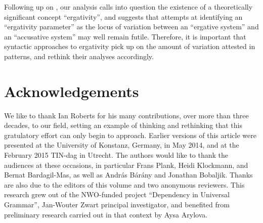 \documentclass[output=paper]{langsci/langscibook}
\begin{document}
Following up on \citet{DeLancey2004}, our analysis calls into question the
existence of a theoretically significant concept \enquote{ergativity}, and
suggests that attempts at identifying an \enquote{ergativity parameter} as the
locus of variation between an \enquote{ergative system} and an
\enquote{accusative system} may well remain futile. Therefore, it is important
that syntactic approaches to ergativity pick up on the amount of variation
attested in  patterns, and rethink their analyses accordingly.

\printchapterglossary

\section*{Acknowledgements}

We like to thank Ian Roberts for his many contributions, over more than three
decades, to our field, setting an example of thinking and rethinking that this
gratulatory effort can only begin to approach. Earlier versions of this article
were presented at the University of Konstanz, Germany, in May 2014, and at the
February 2015 TIN-dag in Utrecht. The authors would like to thank the audiences
at these occasions, in particular Frans Plank, Heidi Klockmann, and Bernat
Bardagil-Mas, as well as András Bárány and Jonathan Bobaljik. Thanks are also
due to the editors of this volume and two anonymous reviewers. This research
grew out of the NWO-funded project \enquote{Dependency in Universal Grammar},
Jan-Wouter Zwart principal investigator, and benefited from preliminary
research carried out in that context by Aysa Arylova.

{\sloppy
\printbibliography[heading=subbibliography,notkeyword=this]
}
\end{document}
